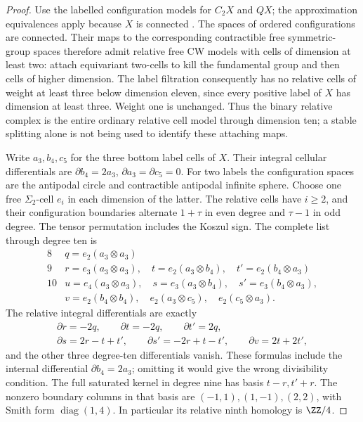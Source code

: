 \begin{proof}
Use the labelled configuration models for $C_2X$ and $QX$;
the approximation equivalences apply because $X$ is connected
\cite[Construction~2.4; Theorem~6.1]{May1972}.
The spaces of ordered configurations are connected. Their
maps to the corresponding contractible free symmetric-group
spaces therefore admit relative free CW models with cells
of dimension at least two: attach equivariant two-cells to
kill the fundamental group and then cells of higher dimension.
The label filtration consequently has no relative cells of
weight at least three below dimension eleven, since every
positive label of $X$ has dimension at least three.
Weight one is unchanged. Thus the binary relative complex
is the entire ordinary relative cell model through dimension
ten; a stable splitting alone is not being used to identify
these attaching maps.

Write $a_3,b_4,c_5$ for the three bottom label cells of $X$.
Their integral cellular differentials are
$\partial b_4=2a_3$, $\partial a_3=\partial c_5=0$.
For two labels the configuration spaces are the antipodal
circle and contractible antipodal infinite sphere. Choose
one free $\Sigma_2$-cell $e_i$ in each dimension of the
latter. The relative cells have $i\ge2$, and their
configuration boundaries alternate $1+\tau$ in even
degree and $\tau-1$ in odd degree. The tensor permutation
includes the Koszul sign. The complete list through degree
ten is
\[
\begin{array}{c|l}
8&q=e_2(a_3\otimes a_3)\\
9&r=e_3(a_3\otimes a_3),\quad
  t=e_2(a_3\otimes b_4),\quad
  t'=e_2(b_4\otimes a_3)\\
10&u=e_4(a_3\otimes a_3),\quad
  s=e_3(a_3\otimes b_4),\quad
  s'=e_3(b_4\otimes a_3),\\
 &v=e_2(b_4\otimes b_4),\quad
  e_2(a_3\otimes c_5),\quad e_2(c_5\otimes a_3).
\end{array}
 \tag{D.2.21b}
\]
The relative integral differentials are exactly
\[
\begin{gathered}
 \partial r=-2q,\qquad \partial t=-2q,
 \qquad \partial t'=2q,\\
 \partial s=2r-t+t',\qquad
 \partial s'=-2r+t-t',\qquad
 \partial v=2t+2t',
\end{gathered}
 \tag{D.2.21c}
\]
and the other three degree-ten differentials vanish.
These formulas include the internal differential
$\partial b_4=2a_3$; omitting it would give the wrong
divisibility condition. The full saturated kernel in
degree nine has basis $t-r,t'+r$. The nonzero boundary
columns in that basis are $(-1,1),(1,-1),(2,2)$, with
Smith form $\operatorname{diag}(1,4)$. In particular its
relative ninth homology is $\ZZ/4$.


\end{proof}
